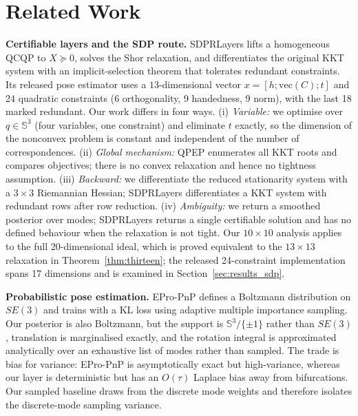 \section{Related Work}\label{sec:related}

\textbf{Certifiable layers and the SDP route.} SDPRLayers \cite{holmes2025sdpr} lifts a homogeneous QCQP to $X\succeq0$, solves the Shor relaxation, and differentiates the original KKT system with an implicit-selection theorem that tolerates redundant constraints. Its released pose estimator uses a $13$-dimensional vector $x=[h;\mathrm{vec}(C);t]$ and 24 quadratic constraints (6 orthogonality, 9 handedness, 9 norm), with the last 18 marked redundant. Our work differs in four ways. (i) \emph{Variable:} we optimise over $q\in\mathbb{S}^3$ (four variables, one constraint) and eliminate $t$ exactly, so the dimension of the nonconvex problem is constant and independent of the number of correspondences. (ii) \emph{Global mechanism:} QPEP enumerates all KKT roots and compares objectives; there is no convex relaxation and hence no tightness assumption. (iii) \emph{Backward:} we differentiate the reduced stationarity system with a $3\times3$ Riemannian Hessian; SDPRLayers differentiates a KKT system with redundant rows after row reduction. (iv) \emph{Ambiguity:} we return a smoothed posterior over modes; SDPRLayers returns a single certifiable solution and has no defined behaviour when the relaxation is not tight. Our $10\times10$ analysis applies to the full 20-dimensional ideal, which is proved equivalent to the $13\times13$ relaxation in Theorem~\ref{thm:thirteen}; the released 24-constraint implementation spans 17 dimensions and is examined in Section~\ref{sec:results_sdp}.

\textbf{Probabilistic pose estimation.} EPro-PnP \cite{chen2022epropnp} defines a Boltzmann distribution on $SE(3)$ and trains with a KL loss using adaptive multiple importance sampling. Our posterior is also Boltzmann, but the support is $\mathbb{S}^3/\{\pm1\}$ rather than $SE(3)$, translation is marginalised exactly, and the rotation integral is approximated analytically over an exhaustive list of modes rather than sampled. The trade is bias for variance: EPro-PnP is asymptotically exact but high-variance, whereas our layer is deterministic but has an $O(\tau)$ Laplace bias away from bifurcations. Our sampled baseline draws from the discrete mode weights and therefore isolates the discrete-mode sampling variance.

